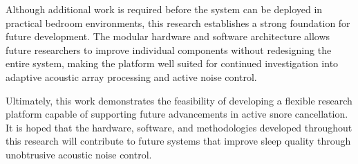 Although additional work is required before the system can be deployed in practical bedroom environments, this research establishes a strong foundation for future development. The modular hardware and software architecture allows future researchers to improve individual components without redesigning the entire system, making the platform well suited for continued investigation into adaptive acoustic array processing and active noise control.

Ultimately, this work demonstrates the feasibility of developing a flexible research platform capable of supporting future advancements in active snore cancellation. It is hoped that the hardware, software, and methodologies developed throughout this research will contribute to future systems that improve sleep quality through unobtrusive acoustic noise control.

